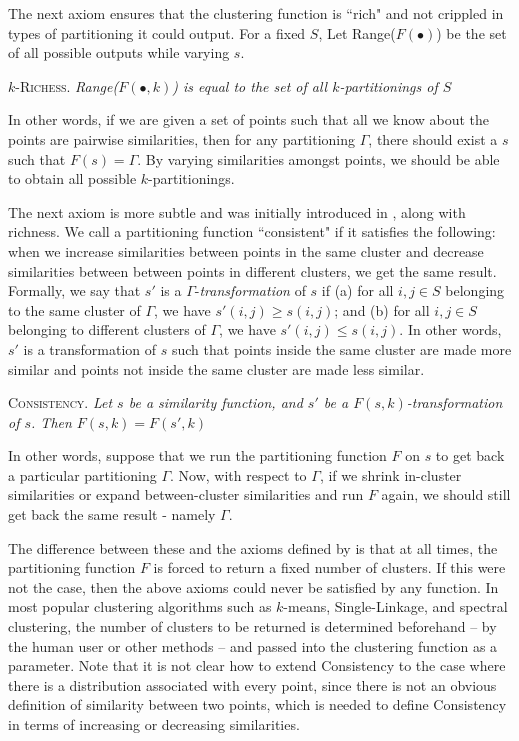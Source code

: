 \documentclass[twoside,11pt]{article}
\begin{document}
The next axiom ensures that the clustering function is ``rich" and not crippled in types of partitioning it could output. For a fixed $S$, Let Range($F(\bullet)$) be the set of all possible outputs while varying $s$.
\begin{center}
\textsc{$k$-Richess.} \textit{Range($F(\bullet, k)$) is equal to the set of all $k$-partitionings of $S$}
\end{center}

In other words, if we are given a set of points such that all we know about the points are pairwise similarities, then for any partitioning $\Gamma$, there should exist a $s$ such that $F(s) = \Gamma$. By varying similarities amongst points, we should be able to obtain all possible $k$-partitionings.

The next axiom is more subtle and was initially introduced in \cite{klein1}, along with richness. We call a partitioning function ``consistent" if it satisfies the following: when we increase similarities between points in the same cluster and decrease similarities between between points in different clusters, we get the same result. Formally, we say that $s'$ is a $\Gamma$-\textit{transformation} of $s$ if (a) for all $i,j \in S$ belonging to the same cluster of $\Gamma$, we have $s'(i,j) \ge s(i,j)$; and (b) for all $i,j \in S$ belonging to different clusters of $\Gamma$, we have $s'(i,j) \le s(i,j)$. In other words, $s'$ is a transformation of $s$ such that points inside the same cluster are made more similar and points not inside the same cluster are made less similar.
\begin{center}
\textsc{Consistency.} \textit{Let $s$ be a similarity function, and $s'$ be a $F(s,k)$-transformation of $s$. Then $F(s,k) = F(s',k)$}
\end{center}

In other words, suppose that we run the partitioning function $F$ on $s$ to get back a particular partitioning $\Gamma$. Now, with respect to $\Gamma$, if we shrink in-cluster similarities or expand between-cluster similarities and run $F$ again, we should still get back the same result - namely $\Gamma$.

The difference between these and the axioms defined by \cite{klein1} is that at all times, the partitioning function $F$ is forced to return a fixed number of clusters. If this were not the case, then the above axioms could never be satisfied by any function. In most popular clustering algorithms such as $k$-means, Single-Linkage,  and spectral clustering, the number of clusters to be returned is determined beforehand -- by the human user or other methods -- and passed into the clustering function as a parameter. Note that it is not clear how to extend Consistency to the case where there is a distribution associated with every point, since there
is not an obvious definition of similarity between two points, which is needed to define Consistency in terms of
increasing or decreasing similarities.
\end{document}

